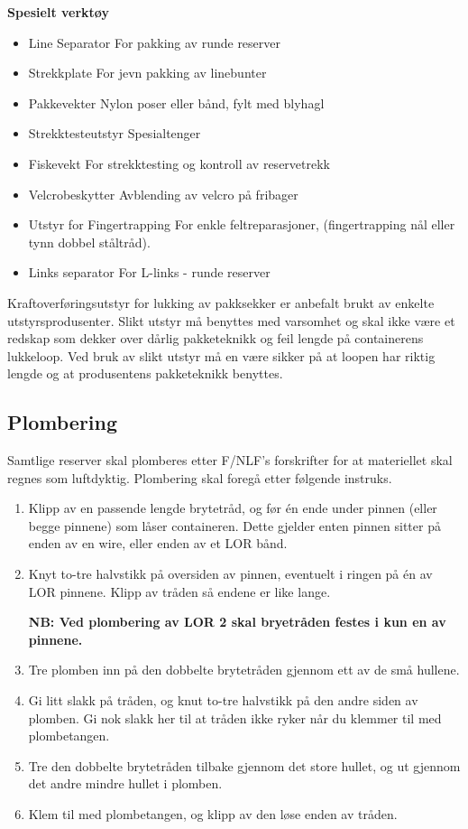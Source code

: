 \textbf{Spesielt verktøy}
\begin{itemize}
	\item Line Separator
	For pakking av runde reserver
	\item Strekkplate
	For jevn pakking av linebunter
	\item Pakkevekter
	Nylon poser eller bånd, fylt med blyhagl
	\item Strekktesteutstyr
	Spesialtenger
	\item Fiskevekt
	For strekktesting og kontroll av reservetrekk
	\item Velcrobeskytter
	Avblending av velcro på fribager
	\item Utstyr for Fingertrapping
	For enkle feltreparasjoner, (fingertrapping nål eller tynn dobbel ståltråd).
	\item Links separator
	For L-links - runde reserver
\end{itemize}

Kraftoverføringsutstyr for lukking av pakksekker er anbefalt brukt av enkelte utstyrsprodusenter. Slikt utstyr må benyttes med varsomhet og skal ikke være et redskap som dekker over dårlig pakketeknikk og feil lengde på containerens lukkeloop. Ved bruk av slikt utstyr må en være sikker på at loopen har riktig lengde og at produsentens pakketeknikk benyttes.

\subsection{Plombering}
Samtlige reserver skal plomberes etter F/NLF's forskrifter for at materiellet skal regnes som luftdyktig. Plombering skal foregå etter følgende instruks.

\begin{enumerate}
	\item Klipp av en passende lengde brytetråd, og før én ende under pinnen (eller begge pinnene) som låser containeren. Dette gjelder enten pinnen sitter på enden av en wire, eller enden av et LOR bånd.

	\item Knyt to-tre halvstikk på oversiden av pinnen, eventuelt i ringen på én av LOR pinnene. Klipp av tråden så endene er like lange.

	\textbf{NB: Ved plombering av LOR 2 skal bryetråden festes i kun en av pinnene.}

	\item Tre plomben inn på den dobbelte brytetråden gjennom ett av de små hullene.

	\item Gi litt slakk på tråden, og knut to-tre halvstikk på den andre siden av plomben. Gi nok slakk her til at tråden ikke ryker når du klemmer til med plombetangen.

	\item Tre den dobbelte brytetråden tilbake gjennom det store hullet, og ut gjennom det andre mindre hullet i plomben.

	\item Klem til med plombetangen, og klipp av den løse enden av tråden.
\end{enumerate}

